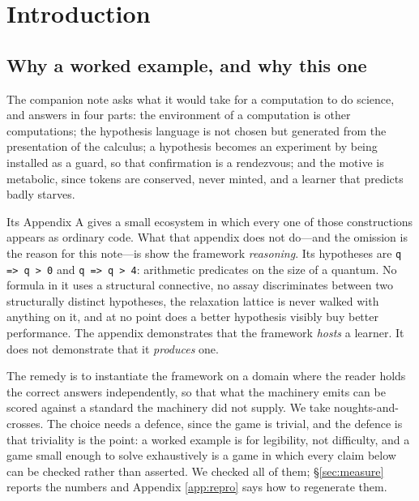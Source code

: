 \documentclass[11pt]{article}
\theoremstyle{definition}
\theoremstyle{plain}
\theoremstyle{remark}
\begin{document}
\tableofcontents

\section{Introduction}

\subsection{Why a worked example, and why this one}

The companion note \cite{scientist} asks what it would take for a computation to
do science, and answers in four parts: the environment of a computation is other
computations; the hypothesis language is not chosen but generated from the
presentation of the calculus; a hypothesis becomes an experiment by being
installed as a guard, so that confirmation is a rendezvous; and the motive is
metabolic, since tokens are conserved, never minted, and a learner that predicts
badly starves.

Its Appendix A gives a small ecosystem in which every one of those constructions
appears as ordinary code. What that appendix does not do---and the omission is
the reason for this note---is show the framework \emph{reasoning}. Its
hypotheses are \texttt{q => q > 0} and \texttt{q => q > 4}: arithmetic
predicates on the size of a quantum. No formula in it uses a structural
connective, no assay discriminates between two structurally distinct
hypotheses, the relaxation lattice is never walked with anything on it, and at
no point does a better hypothesis visibly buy better performance. The appendix
demonstrates that the framework \emph{hosts} a learner. It does not demonstrate
that it \emph{produces} one.

The remedy is to instantiate the framework on a domain where the reader holds
the correct answers independently, so that what the machinery emits can be
scored against a standard the machinery did not supply. We take
noughts-and-crosses. The choice needs a defence, since the game is trivial, and
the defence is that triviality is the point: a worked example is for legibility,
not difficulty, and a game small enough to solve exhaustively is a game in which
every claim below can be checked rather than asserted. We checked all of them;
\S\ref{sec:measure} reports the numbers and Appendix \ref{app:repro} says how to
regenerate them.
\end{document}
